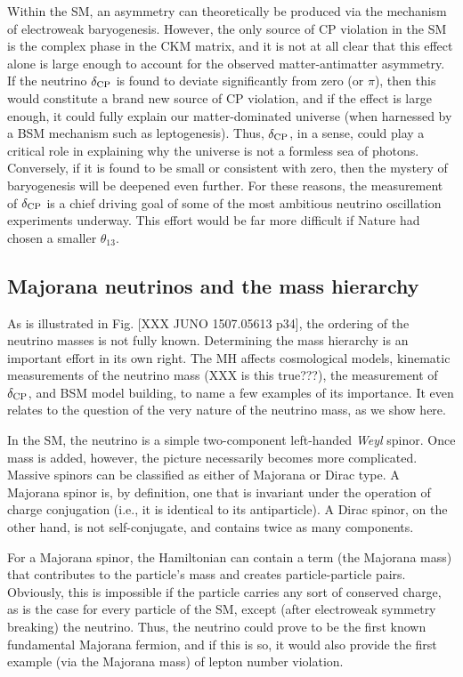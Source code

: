 \documentclass[../thesis.tex]{subfiles}
\begin{document}
Within the SM, an asymmetry can theoretically be produced via the mechanism of electroweak baryogenesis. However, the only source of CP violation in the SM is the complex phase in the CKM matrix, and it is not at all clear that this effect alone is large enough to account for the observed matter-antimatter asymmetry. If the neutrino $\delta_\text{CP}$ is found to deviate significantly from zero (or $\pi$), then this would constitute a brand new source of CP violation, and if the effect is large enough, it could fully explain our matter-dominated universe (when harnessed by a BSM mechanism such as leptogenesis). Thus, $\delta_\text{CP}$, in a sense, could play a critical role in explaining why the universe is not a formless sea of photons. Conversely, if it is found to be small or consistent with zero, then the mystery of baryogenesis will be deepened even further. For these reasons, the measurement of $\delta_\text{CP}$ is a chief driving goal of some of the most ambitious neutrino oscillation experiments underway. This effort would be far more difficult if Nature had chosen a smaller $\theta_{13}$.

\subsection{Majorana neutrinos and the mass hierarchy}
\label{sec:majorana}

As is illustrated in Fig. [XXX JUNO 1507.05613 p34], the ordering of the neutrino masses is not fully known. Determining the mass hierarchy is an important effort in its own right. The MH affects cosmological models, kinematic measurements of the neutrino mass (XXX is this true???), the measurement of $\delta_\text{CP}$, and BSM model building, to name a few examples of its importance. It even relates to the question of the very nature of the neutrino mass, as we show here.

In the SM, the neutrino is a simple two-component left-handed \emph{Weyl} spinor. Once mass is added, however, the picture necessarily becomes more complicated. Massive spinors can be classified as either of Majorana or Dirac type. A Majorana spinor is, by definition, one that is invariant under the operation of charge conjugation (i.e., it is identical to its antiparticle). A Dirac spinor, on the other hand, is not self-conjugate, and contains twice as many components.

For a Majorana spinor, the Hamiltonian can contain a term (the Majorana mass) that contributes to the particle's mass and creates particle-particle pairs. Obviously, this is impossible if the particle carries any sort of conserved charge, as is the case for every particle of the SM, except (after electroweak symmetry breaking) the neutrino. Thus, the neutrino could prove to be the first known fundamental Majorana fermion, and if this is so, it would also provide the first example (via the Majorana mass) of lepton number violation.
\end{document}
